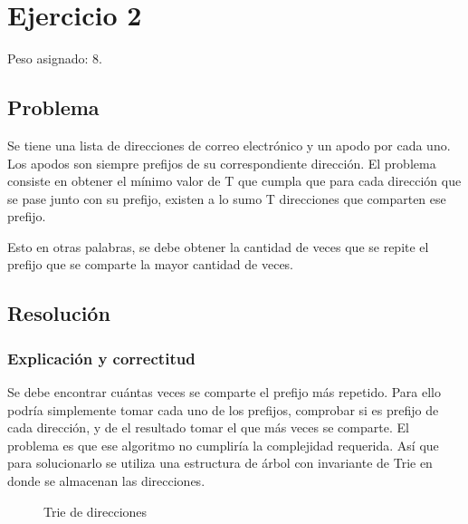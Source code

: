 \section{Ejercicio 2}

Peso asignado: 8.

\subsection{Problema}

Se tiene una lista de direcciones de correo electrónico y un apodo por cada
uno. Los apodos son siempre prefijos de su correspondiente dirección. El
problema consiste en obtener el mínimo valor de T que cumpla que para cada
dirección que se pase junto con su prefijo, existen a lo sumo T direcciones
que comparten ese prefijo.

Esto en otras palabras, se debe obtener la cantidad de veces que se repite el
prefijo que se comparte la mayor cantidad de veces.

\subsection{Resolución}

\subsubsection{Explicación y correctitud}

Se debe encontrar cuántas veces se comparte el prefijo más repetido. Para ello
podría simplemente tomar cada uno de los prefijos, comprobar si es prefijo de
cada dirección, y de el resultado tomar el que más veces se comparte. El
problema es que ese algoritmo no cumpliría la complejidad requerida. Así que
para solucionarlo se utiliza una estructura de árbol con invariante de Trie
en donde se almacenan las direcciones.

\begin{figure}[ht]
	\caption{Trie de direcciones}
	\label{ej2:trie}
	\centering
\end{figure}

